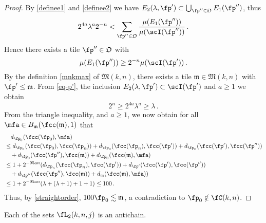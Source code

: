 \begin{proof}
    By \eqref{definee1} and \eqref{definee2} we have $E_2(\lambda, \fp') \subset \bigcup_{\fp'' \in \mathfrak{O}} E_1(\fp'')$, thus
    $$
        2^{4a}\lambda^a 2^{-n} < \sum_{\fp'' \in \mathfrak{O}} \frac{\mu(E_1(\fp''))}{\mu(\scI(\fp''))}\,.
    $$
    Hence there exists a tile $\fp'' \in \mathfrak{O}$ with
    \begin{equation*}
        \mu(E_1(\fp'')) \ge 2^{-n} \mu(\scI(\fp'))\,.
    \end{equation*}
    By the definition \eqref{mnkmax} of $\mathfrak{M}(k,n)$, there exists a tile $\mathfrak{m} \in \mathfrak{M}(k,n)$ with $\fp' \leq \mathfrak{m}$. From \eqref{eq-p'}, the inclusion $E_2(\lambda, \fp') \subset \scI(\fp')$ and $a\ge 1$ we obtain
    $$
        2^n \geq 2^{4a} \lambda^{a} \geq \lambda\,.
    $$
    From the triangle inequality,  and $a \ge 1$, we now obtain for all $\mfa \in B_{\mathfrak{m}}(\fcc(\mathfrak{m}), 1)$ that
    \begin{align*}
        &\quad d_{\fp_0}(\fcc(\fp_0), \mfa)\\
        &\leq d_{\fp_0}(\fcc(\fp_0), \fcc(\fp_{n})) + d_{\fp_0}(\fcc(\fp_{n}), \fcc(\fp')) + d_{\fp_0}(\fcc(\fp'), \fcc(\fp''))\\
        &\quad+ d_{\fp_0}(\fcc(\fp''), \fcc(\mathfrak{m})) +
        d_{\fp_0}(\fcc(\mathfrak{m}), \mfa)\\
        &\leq 1 + 2^{-95an} (d_{\fp_{n}}(\fcc(\fp_n), \fcc(\fp')) + d_{\fp'}(\fcc(\fp'), \fcc(\fp''))\\
        &\quad+ d_{\fp''}(\fcc(\fp''), \fcc(\mathfrak{m})) +
        d_{\mathfrak{m}}(\fcc(\mathfrak{m}), \mfa))\\
        &\leq 1 + 2^{-95an}(\lambda + (\lambda + 1) + 1 + 1) \leq 100\,.
    \end{align*}
    Thus, by \eqref{straightorder}, $100\fp_0 \lesssim \mathfrak{m}$, a contradiction to $\fp_0 \notin \fC(k,n)$.
\end{proof}

\begin{lemma}[L2 antichain]
\label{L2-antichain}
    Each of the sets $\fL_2(k,n,j)$ is an antichain.
\end{lemma}

